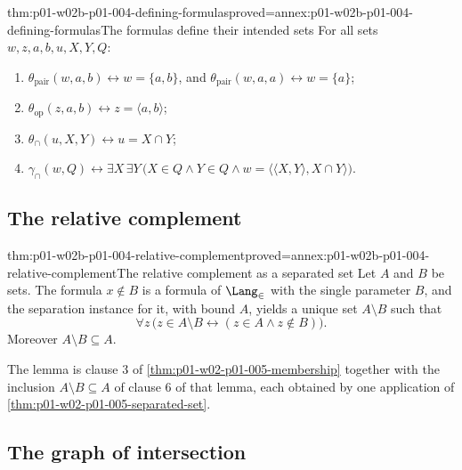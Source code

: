 \begin{hblemma}{thm:p01-w02b-p01-004-defining-formulas}{proved=annex:p01-w02b-p01-004-defining-formulas}{The formulas define their intended sets}
For all sets \(w,z,a,b,u,X,Y,Q\):
\begin{enumerate}
  \item \(\theta_{\mathrm{pair}}(w,a,b)\leftrightarrow w=\{a,b\}\), and
        \(\theta_{\mathrm{pair}}(w,a,a)\leftrightarrow w=\{a\}\);
  \item \(\theta_{\mathrm{op}}(z,a,b)\leftrightarrow z=\langle a,b\rangle\);
  \item \(\theta_{\cap}(u,X,Y)\leftrightarrow u=X\cap Y\);
  \item \(\gamma_{\cap}(w,Q)\leftrightarrow\exists X\,\exists Y\,
        \bigl(X\in Q\land Y\in Q\land
        w=\langle\langle X,Y\rangle,X\cap Y\rangle\bigr)\).
\end{enumerate}
\end{hblemma}

\subsection{The relative complement}
\label{sec:p01-w02b-p01-004-relative-complement}

\begin{hblemma}{thm:p01-w02b-p01-004-relative-complement}{proved=annex:p01-w02b-p01-004-relative-complement}{The relative complement as a separated set}
Let \(A\) and \(B\) be sets. The formula \(x\notin B\) is a formula of
\(\Lang_{\in}\) with the single parameter \(B\), and the separation instance
for it, with bound \(A\), yields a unique set \(A\setminus B\) such that
\[
  \forall z\,\bigl(z\in A\setminus B\leftrightarrow(z\in A\land z\notin B)\bigr).
\]
Moreover \(A\setminus B\subseteq A\).
\end{hblemma}

The lemma is clause 3 of \cref{thm:p01-w02-p01-005-membership} together with
the inclusion \(A\setminus B\subseteq A\) of clause 6 of that lemma, each
obtained by one application of \cref{thm:p01-w02-p01-005-separated-set}.

\subsection{The graph of intersection}
\label{sec:p01-w02b-p01-004-graph}


